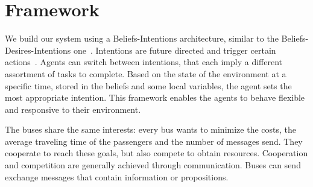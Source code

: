 \section{Framework}

We build our system using a Beliefs-Intentions architecture, similar to the Beliefs-Desires-Intentions one~\cite{caillou2017simple}. Intentions are future directed and trigger certain actions~\cite{multiagentsystems}. Agents can switch between intentions, that each imply a different assortment of tasks to complete. Based on the state of the environment at a specific time, stored in the beliefs and some local variables, the agent sets the most appropriate intention. This framework enables the agents to behave flexible and responsive to their environment.

The buses share the same interests: every bus wants to minimize the costs, the average traveling time of the passengers and the number of messages send. They cooperate to reach these goals, but also compete to obtain resources. Cooperation and competition are generally achieved through communication. Buses can send exchange messages that contain information or propositions.

